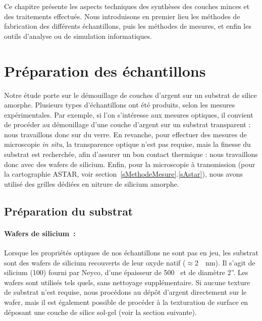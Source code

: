 \minitoc
\newpage

Ce chapitre présente les aspects techniques des synthèses des couches minces et des traitements effectués. Nous introduisons en premier lieu les méthodes de fabrication des différents échantillons, puis les méthodes de mesures, et enfin les outils d'analyse ou de simulation informatiques.\par 

\section{Préparation des échantillons}
Notre étude porte sur le démouillage de couches d'argent sur un substrat de silice amorphe. Plusieurs types d'échantillons ont été produits, selon les mesures expérimentales. Par exemple, si l'on s'intéresse aux mesures optiques, il convient de procéder au démouillage d'une couche d'argent sur un substrat transparent : nous travaillons donc sur du verre. En revanche, pour effectuer des mesures de microscopie \textit{in situ}, la transparence optique n'est pas requise, mais la finesse du substrat est recherchée, afin d'assurer un bon contact thermique : nous travaillons donc avec des wafers de silicium. Enfin, pour la microscopie à transmission (pour la cartographie ASTAR, voir section~\ref{sMethodeMesure}.\ref{sAstar}), nous avons utilisé des grilles dédiées en nitrure de silicium amorphe.\par 

	\subsection{Préparation du substrat}
\paragraph*{Wafers de silicium~:} Lorsque les propriétés optiques de nos échantillons ne sont pas en jeu, les substrat sont des wafers de silicium recouverts de leur oxyde natif ($\approx$2~~nm). Il s'agit de silicium (100) fourni par Neyco, d'une épaisseur de 500~\micro\meter{} et de diamètre 2”. Les wafers sont utilisés tels quels, sans nettoyage supplémentaire. Si aucune texture de substrat n'est requise, nous procédons au dépôt d'argent directement sur le wafer, mais il est également possible de procéder à la texturation de surface en déposant une couche de silice sol-gel (voir la section suivante).\par 

